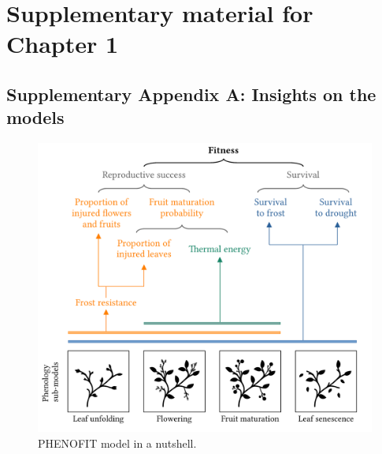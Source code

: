 
\section{Supplementary material for Chapter 1}
\label{supp:chapter1}

\vspace*{1cm}

\subsection{Supplementary Appendix A: Insights on the
models}
\label{chap1:appendixA}




\begin{figure}[htbp]
\centering \includegraphics{chapter1/figs/supp/phenofit} 
\caption{PHENOFIT model in a nutshell.}\label{figS:phenofit_model}
\end{figure}

